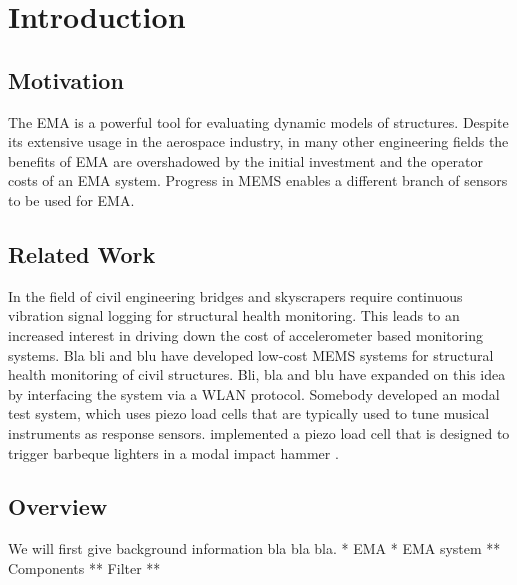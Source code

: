\setcounter{chapter}{0}

\chapter{Introduction}

\section{Motivation}
The \ac{EMA} is a powerful tool for evaluating dynamic models of structures. Despite its extensive usage in the aerospace industry, in many other engineering fields the benefits of \ac{EMA} are overshadowed by the initial investment and the operator costs of an \ac{EMA} system. Progress in \ac{MEMS} enables a different branch of sensors to be used for \ac{EMA}.

\section{Related Work}
In the field of civil engineering bridges and skyscrapers require continuous vibration signal logging for structural health monitoring. This leads to an increased interest in driving down the cost of accelerometer based monitoring systems. {Bla bli and blu} have developed low-cost \ac{MEMS} systems for structural health monitoring of civil structures. {Bli, bla and blu} have expanded on this idea by interfacing the system via a \ac{WLAN} protocol.
{Somebody} developed an modal test system, which uses piezo load cells that are typically used to tune musical instruments as response sensors. \citeauthor{waltham2009construction} implemented a piezo load cell that is designed to trigger barbeque lighters in a modal impact hammer \cite{waltham2009construction}.

\cite{beskhyroun2012low}

\section{Overview}
We will first give background information bla bla bla.
* EMA
* EMA system
** Components
** Filter
** 


